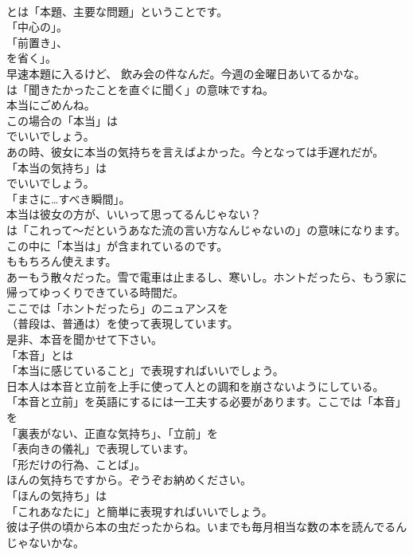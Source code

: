 \documentclass[8pt]{extreport}
\begin{document}
\begin{CJK}{UTF8}{min}
\\	とは「本題、主要な問題」ということです。
\\	「中心の」。
\\	「前置き」、
\\	を省く」。	
\\	早速本題に入るけど、 飲み会の件なんだ。今週の金曜日あいてるかな。 
\\	は「聞きたかったことを直ぐに聞く」の意味ですね。	
\\	本当にごめんね。 
\\	この場合の「本当」は
\\	でいいでしょう。	
\\	あの時、彼女に本当の気持ちを言えばよかった。今となっては手遅れだが。 
\\	「本当の気持ち」は
\\	でいいでしょう。
\\	「まさに…すべき瞬間」。	
\\	本当は彼女の方が、いいって思ってるんじゃない？ 
\\	は「これって～だというあなた流の言い方なんじゃないの」の意味になります。この中に「本当は」が含まれているのです。
\\	ももちろん使えます。	
\\	あーもう散々だった。雪で電車は止まるし、寒いし。ホントだったら、もう家に帰ってゆっくりできている時間だ。 
\\	ここでは「ホントだったら」のニュアンスを 
\\	（普段は、普通は）を使って表現しています。	
\\	是非、本音を聞かせて下さい。 
\\	「本音」とは
\\	「本当に感じていること」で表現すればいいでしょう。	
\\	日本人は本音と立前を上手に使って人との調和を崩さないようにしている。 
\\	「本音と立前」を英語にするには一工夫する必要があります。ここでは「本音」を
\\	「裏表がない、正直な気持ち」、「立前」を
\\	「表向きの儀礼」で表現しています。
\\	「形だけの行為、ことば」。	
\\	ほんの気持ちですから。ぞうぞお納めください。 
\\	「ほんの気持ち」は
\\	「これあなたに」と簡単に表現すればいいでしょう。	
\\	彼は子供の頃から本の虫だったからね。いまでも毎月相当な数の本を読んでるんじゃないかな。 

\end{CJK}
\end{document}
